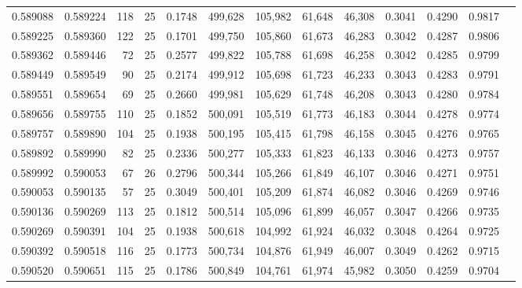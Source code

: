 \begin{tabular}{rrrrrrrrrrrrr}
0.589088 & 0.589224 &   118 &  25 &                                     0.1748 & 499,628 & 105,982 &  61,648 &  46,308 & 0.3041 & 0.4290 & 0.9817 \\
0.589225 & 0.589360 &   122 &  25 &                                     0.1701 & 499,750 & 105,860 &  61,673 &  46,283 & 0.3042 & 0.4287 & 0.9806 \\
0.589362 & 0.589446 &    72 &  25 &                                     0.2577 & 499,822 & 105,788 &  61,698 &  46,258 & 0.3042 & 0.4285 & 0.9799 \\
0.589449 & 0.589549 &    90 &  25 &                                     0.2174 & 499,912 & 105,698 &  61,723 &  46,233 & 0.3043 & 0.4283 & 0.9791 \\
0.589551 & 0.589654 &    69 &  25 &                                     0.2660 & 499,981 & 105,629 &  61,748 &  46,208 & 0.3043 & 0.4280 & 0.9784 \\
0.589656 & 0.589755 &   110 &  25 &                                     0.1852 & 500,091 & 105,519 &  61,773 &  46,183 & 0.3044 & 0.4278 & 0.9774 \\
0.589757 & 0.589890 &   104 &  25 &                                     0.1938 & 500,195 & 105,415 &  61,798 &  46,158 & 0.3045 & 0.4276 & 0.9765 \\
0.589892 & 0.589990 &    82 &  25 &                                     0.2336 & 500,277 & 105,333 &  61,823 &  46,133 & 0.3046 & 0.4273 & 0.9757 \\
0.589992 & 0.590053 &    67 &  26 &                                     0.2796 & 500,344 & 105,266 &  61,849 &  46,107 & 0.3046 & 0.4271 & 0.9751 \\
0.590053 & 0.590135 &    57 &  25 &                                     0.3049 & 500,401 & 105,209 &  61,874 &  46,082 & 0.3046 & 0.4269 & 0.9746 \\
0.590136 & 0.590269 &   113 &  25 &                                     0.1812 & 500,514 & 105,096 &  61,899 &  46,057 & 0.3047 & 0.4266 & 0.9735 \\
0.590269 & 0.590391 &   104 &  25 &                                     0.1938 & 500,618 & 104,992 &  61,924 &  46,032 & 0.3048 & 0.4264 & 0.9725 \\
0.590392 & 0.590518 &   116 &  25 &                                     0.1773 & 500,734 & 104,876 &  61,949 &  46,007 & 0.3049 & 0.4262 & 0.9715 \\
0.590520 & 0.590651 &   115 &  25 &                                     0.1786 & 500,849 & 104,761 &  61,974 &  45,982 & 0.3050 & 0.4259 & 0.9704 \\

\end{tabular}
